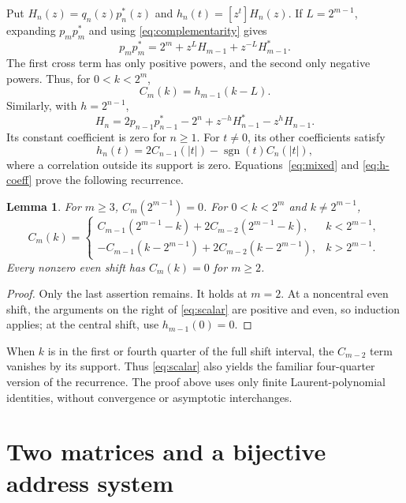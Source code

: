 \documentclass[11pt,a4paper]{article}
\newtheorem{lemma}[theorem]{Lemma}
\theoremstyle{definition}\newtheorem{definition}[theorem]{Definition}
\theoremstyle{remark}\newtheorem{remark}[theorem]{Remark}
\newcommand{\sgn}{\operatorname{sgn}}
\begin{document}
Put $H_n(z)=q_n(z)p_n^*(z)$ and $h_n(t)=[z^t]H_n(z)$.
If $L=2^{m-1}$, expanding $p_mp_m^*$ and using
\eqref{eq:complementarity} gives
\[
 p_mp_m^*=2^m+z^L H_{m-1}+z^{-L}H_{m-1}^*.
\]
The first cross term has only positive powers, and the second only negative
powers. Thus, for $0<k<2^m$,
\begin{equation}
 C_m(k)=h_{m-1}(k-L).
 \label{eq:mixed}
\end{equation}
Similarly, with $h=2^{n-1}$,
\[
 H_n=2p_{n-1}p_{n-1}^*-2^n+z^{-h}H_{n-1}^*-z^hH_{n-1}.
\]
Its constant coefficient is zero for $n\ge1$. For $t\ne0$, its other
coefficients satisfy
\begin{equation}
 h_n(t)=2C_{n-1}(|t|)-\sgn(t)C_n(|t|),
 \label{eq:h-coeff}
\end{equation}
where a correlation outside its support is zero.
Equations~\eqref{eq:mixed} and \eqref{eq:h-coeff} prove the following recurrence.

\begin{lemma}
\label{lem:scalar}
For $m\ge3$, $C_m(2^{m-1})=0$. For $0<k<2^m$ and $k\ne2^{m-1}$,
\begin{equation}
 C_m(k)=
 \begin{cases}
 C_{m-1}(2^{m-1}-k)+2C_{m-2}(2^{m-1}-k), & k<2^{m-1},\\
 -C_{m-1}(k-2^{m-1})+2C_{m-2}(k-2^{m-1}), & k>2^{m-1}.
 \end{cases}
 \label{eq:scalar}
\end{equation}
Every nonzero even shift has $C_m(k)=0$ for $m\ge2$.
\end{lemma}

\begin{proof}
Only the last assertion remains. It holds at $m=2$. At a noncentral even
shift, the arguments on the right of \eqref{eq:scalar} are positive and even,
so induction applies; at the central shift, use $h_{m-1}(0)=0$.
\end{proof}

When $k$ is in the first or fourth quarter of the full shift interval, the
$C_{m-2}$ term vanishes by its support. Thus \eqref{eq:scalar} also yields
the familiar four-quarter version of the recurrence. The proof above uses
only finite Laurent-polynomial identities, without convergence or asymptotic
interchanges.

\section{Two matrices and a bijective address system}
\label{sec:matrices}
\end{document}

